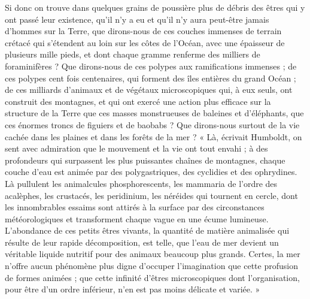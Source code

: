 \documentclass[a4paper, 11pt, oneside]{article}
\begin{document}
Si donc on trouve dans quelques grains de poussière plus de débris des êtres qui y ont passé leur existence, qu'il n'y a eu et qu'il n'y aura peut-être jamais d'hommes sur la Terre, que dirons-nous de ces couches immenses de terrain crétacé qui s'étendent au loin sur les côtes de l'Océan, avec une épaisseur de plusieurs mille pieds, et dont chaque gramme renferme des milliers de foraminifères ? Que dirons-nous de ces polypes aux ramifications immenses ; de ces polypes cent fois centenaires, qui forment des îles entières du grand Océan ; de ces milliards d'animaux et de végétaux microscopiques qui, à eux seuls, ont construit des montagnes, et qui ont exercé une action plus efficace sur la structure de la Terre que ces masses monstrueuses de baleines et d'éléphants, que ces énormes troncs de figuiers et de baobabs ? Que dirons-nous surtout de la vie cachée dans les plaines et dans les forêts de la mer ? « Là, écrivait Humboldt, on sent avec admiration que le mouvement et la vie ont tout envahi ; à des profondeurs qui surpassent les plus puissantes chaînes de montagnes, chaque couche d'eau est animée par des polygastriques, des cyclidies et des ophrydines. Là pullulent les animalcules phosphorescents, les mammaria de l'ordre des acalèphes, les crustacés, les peridinium, les néréides qui tournent en cercle, dont les innombrables essaims sont attirés à la surface par des circonstances météorologiques et transforment chaque vague en une écume lumineuse. L'abondance de ces petits êtres vivants, la quantité de matière animalisée qui résulte de leur rapide décomposition, est telle, que l'eau de mer devient un véritable liquide nutritif pour des animaux beaucoup plus grands. Certes, la mer n'offre aucun phénomène plus digne d'occuper l'imagination que cette profusion de formes animées ; que cette infinité d'êtres microscopiques dont l'organisation, pour être d'un ordre inférieur, n'en est pas moins délicate et variée. »
\end{document}
